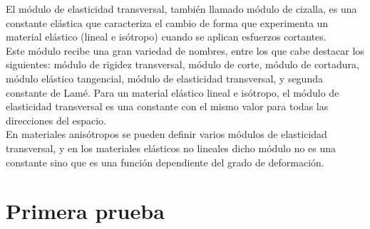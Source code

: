 \documentclass[11pt,a4paper,oldfontcommands,oneside]{memoir}
\begin{document}
\begin{flushleft}

El módulo de elasticidad transversal, también llamado módulo de cizalla, es una constante elástica que caracteriza el cambio de forma que experimenta un material elástico (lineal e isótropo) cuando se aplican esfuerzos cortantes.\\

Este módulo recibe una gran variedad de nombres, entre los que cabe destacar los siguientes: módulo de rigidez transversal, módulo de corte, módulo de cortadura, módulo elástico tangencial, módulo de elasticidad transversal, y segunda constante de Lamé. 
Para un material elástico lineal e isótropo, el módulo de elasticidad transversal es una constante con el mismo valor para todas las direcciones del espacio.\\ 

En materiales anisótropos se pueden definir varios módulos de elasticidad transversal, y en los materiales elásticos no lineales dicho módulo no es una constante sino que es una función dependiente del grado de deformación. 

\end{flushleft}

\chapter{Primera prueba}
\end{document}
